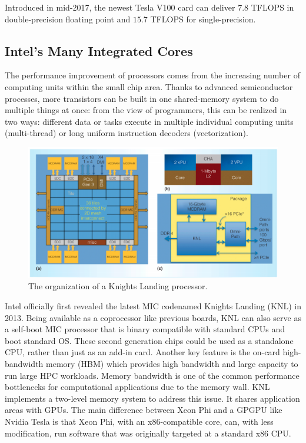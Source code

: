 Introduced in mid-2017, the newest Tesla V100 card can deliver $7.8$ TFLOPS in double-precision floating point and $15.7$ TFLOPS for single-precision.

\subsection{Intel's Many Integrated Cores}

The performance improvement of processors comes from the increasing number of computing units within the small chip area. Thanks to advanced semiconductor processes, more transistors can be built in one shared-memory system to do multiple things at once: from the view of programmers, this can be realized in two ways: different data or tasks execute in multiple individual computing units (multi-thread) or long uniform instruction decoders (vectorization).

\begin{figure}[htbp]
	\centering
	\includegraphics[width=6.2in]{fig/KNL1.png}
	\caption{The organization of a Knights Landing processor.}
	\label{knl1}
\end{figure}

Intel officially first revealed the latest MIC codenamed Knights Landing (KNL) in 2013. Being available as a coprocessor like previous boards, KNL can also serve as a self-boot MIC processor that is binary compatible with standard CPUs and boot
standard OS. These second generation chips could be used as a standalone CPU, rather than just as an add-in card. Another key feature is the on-card high-bandwidth memory (HBM) which provides high bandwidth and large capacity to run large HPC workloads. Memory bandwidth is one of the common performance bottlenecks for computational applications due to the memory wall. KNL implements a two-level memory system to address this issue. It shares application areas with GPUs. The main difference between Xeon Phi and a GPGPU like Nvidia Tesla is that Xeon Phi, with an x86-compatible core, can, with less modification, run software that was originally targeted at a standard x86 CPU.

